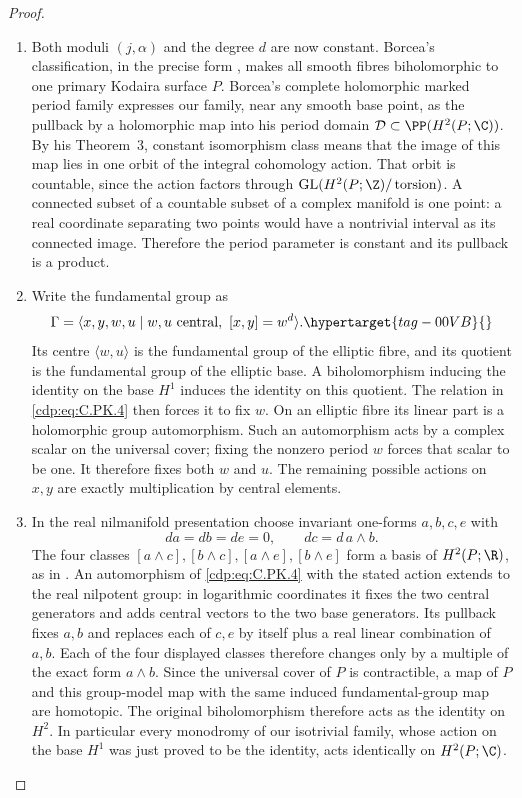 \begin{proof}
\begin{enumerate}[leftmargin=*]
\item Both moduli $(j,\alpha)$ and the degree $d$ are now
constant. Borcea's classification, in the precise form
\cite[\S1]{SS2002}, makes all smooth fibres biholomorphic
to one primary Kodaira surface $P$. Borcea's complete
holomorphic marked period family \cite[Remark~1]{Borcea1984}
expresses our family, near any smooth base point, as the
pullback by a holomorphic map into his period domain
$\mathcal D\subset\PP(H^2(P;\C))$. By his Theorem~3,
constant isomorphism class means that the image of this
map lies in one orbit of the integral cohomology action.
That orbit is countable, since the action factors through
$\operatorname{GL}(H^2(P;\Z)/\operatorname{torsion})$.
A connected subset of a countable subset of a complex
manifold is one point: a real coordinate separating two
points would have a nontrivial interval as its connected
image. Therefore the period parameter is constant and
its pullback is a product. 
\item Write the fundamental group as
\begin{equation}
 \Gamma=\langle x,y,w,u\mid
       w,u\text{ central},\ [x,y]=w^d\rangle.
\hypertarget{tag-00VB}{}\label{cdp:eq:C.PK.4}
\end{equation}
Its centre $\langle w,u\rangle$ is the fundamental group
of the elliptic fibre, and its quotient is the fundamental
group of the elliptic base. A biholomorphism inducing the
identity on the base $H^1$ induces the identity on this
quotient. The relation in \eqref{cdp:eq:C.PK.4} then forces it to fix
$w$. On an elliptic fibre its linear part is a holomorphic
group automorphism. Such an automorphism acts by a complex
scalar on the universal cover; fixing the nonzero period
$w$ forces that scalar to be one. It therefore fixes both
$w$ and $u$. The remaining possible actions on $x,y$ are
exactly multiplication by central elements.

\item In the real
nilmanifold presentation choose invariant one-forms
$a,b,c,e$ with
\[
 da=db=de=0,\qquad dc=d\,a\wedge b.
\]
The four classes $[a\wedge c],[b\wedge c],
[a\wedge e],[b\wedge e]$ form a basis of
$H^2(P;\R)$, as in \cite[\S3]{Borcea1984}.
An automorphism of \eqref{cdp:eq:C.PK.4} with the stated action extends
to the real nilpotent group: in logarithmic coordinates it
fixes the two central generators and adds central vectors
to the two base generators. Its pullback fixes $a,b$ and
replaces each of $c,e$ by itself plus a real linear
combination of $a,b$. Each of the four displayed classes
therefore changes only by a multiple of the exact form
$a\wedge b$. Since the universal cover of $P$ is
contractible, a map of $P$ and this group-model map with
the same induced fundamental-group map are homotopic.
The original biholomorphism therefore acts as the identity on $H^2$.
In particular every monodromy of our isotrivial family,
whose action on the base $H^1$ was just proved to be the
identity, acts identically on $H^2(P;\C)$.


\end{enumerate}
\end{proof}
